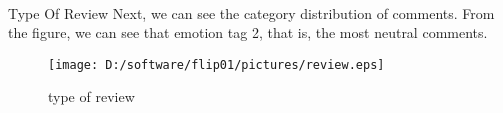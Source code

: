 \documentclass[
 size=12pt,
 paper=smartboard, %
 mode=present, %
 display=slides, %
style=tuliplab,
pauseslide,
fleqn,leqno]{powerdot}
\begin{document}
    \
  
  

\begin{slide}{Type Of Review}
  \hspace{0.5cm}  Next, we can see the category distribution of comments. From the figure, we can see that emotion tag 2, that is, the most neutral comments. \\
  
  \vspace{1cm}
  \begin{figure}[ht]%
   \centering%
   \texttt{[image: D:/software/flip01/pictures/review.eps]}
   \caption{type of review}%
   \end{figure}
\end{slide}
\end{document}
